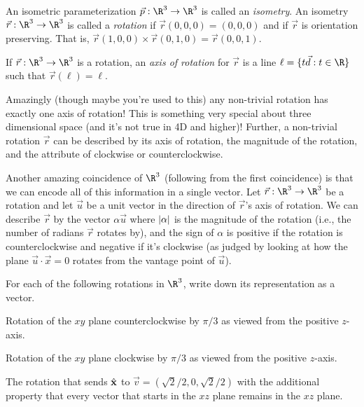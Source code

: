	\begin{numberlessdefinition}[Rotation]
		An isometric parameterization $\vec p:\R^3\to\R^3$ is called an \emph{isometry}.
		An isometry $\vec r:\R^3\to\R^3$ is called a \emph{rotation} if $\vec r(0,0,0)=(0,0,0)$
		and if $\vec r$ is orientation preserving.  That is, $\vec r(1,0,0)\times \vec r(0,1,0) = \vec r(0,0,1)$.

		If $\vec r:\R^3\to\R^3$ is a rotation, an \emph{axis of rotation} for $\vec r$ is a line
		$\ell = \{t\vec d:t\in\R\}$ such that $\vec r(\ell) = \ell$.
	\end{numberlessdefinition}

	Amazingly (though maybe you're used to this) any non-trivial rotation has exactly one axis of rotation!
	This is something very special about three dimensional space (and it's not true in 4D and higher)!  
	Further, a non-trivial rotation $\vec r$ can be described
	by its axis of rotation, the magnitude of the rotation, and the attribute of clockwise or counterclockwise.

	Another amazing coincidence of $\R^3$ (following from the first coincidence) 
	is that we can encode all of this information in a single vector.
	Let $\vec r:\R^3\to \R^3$ be a rotation and let $\vec u$ be a unit vector in the direction of $\vec r$'s 
	axis of rotation.  We can describe $\vec r$ by the vector $\alpha \vec u$ where $\lvert\alpha\rvert$ is the magnitude
	of the rotation (i.e., the number of radians $\vec r$ rotates by), and the sign of $\alpha$ is positive
	if the rotation is counterclockwise and negative if it's clockwise (as judged by looking at
	how the plane $\vec u\cdot \vec x=0$ rotates from the vantage point of $\vec u$).

\begin{question}
	For each of the following rotations in $\R^3$, write down its representation as a vector.
	\begin{parts}
		\item Rotation of the $xy$ plane counterclockwise by $\pi/3$ as viewed from the positive $z$-axis.
		\item Rotation of the $xy$ plane clockwise by $\pi/3$ as viewed from the positive $z$-axis.
		\item The rotation that sends ${\hat {\mathbf x}}$ to $\vec v=(\sqrt{2}/2, 0, \sqrt{2}/2)$ with the additional
			property that every vector that starts in the $xz$ plane remains in
			the $xz$ plane.
	\end{parts}
\end{question}

